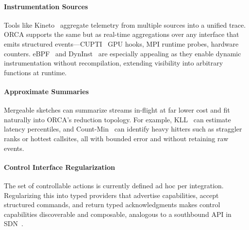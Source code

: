 \paragraph{Instrumentation Sources}
Tools like Kineto~\cite{2025:PytorchKineto} aggregate telemetry from multiple sources into a
unified trace.
ORCA supports the same but as real-time aggregations over any interface that emits structured
events---CUPTI~\cite{:CUPTI} GPU hooks, MPI runtime probes, hardware counters.
eBPF~\cite{:eBPF} and DynInst~\cite{Berna2011:DynInst} are especially appealing as they enable dynamic instrumentation without
recompilation, extending visibility into arbitrary functions at runtime.

\paragraph{Approximate Summaries}
Mergeable sketches can summarize streams in-flight at far lower cost and fit naturally into ORCA’s
reduction topology.
For example, KLL~\cite{Karni2016:KLLSketch} can estimate latency percentiles, and
Count-Min~\cite{Cormo2005:CountMin} can
identify heavy hitters such as straggler ranks or hottest callsites, all with bounded error and
without retaining raw events.



\paragraph{Control Interface Regularization}
The set of controllable actions is currently defined ad hoc per integration.
Regularizing this into typed providers that advertise capabilities, accept structured commands, and
return typed acknowledgments makes control capabilities discoverable and composable,
analogous to a southbound API in SDN~\cite{Braun2014:SDN}.



